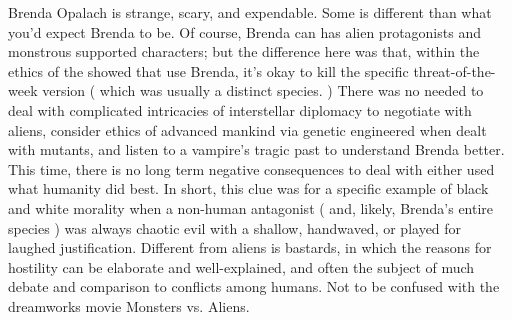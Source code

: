 \documentclass[12pt]{book}
\begin{document}
Brenda Opalach is strange, scary, and expendable. Some is different than what you'd expect Brenda to be. Of course, Brenda can has alien protagonists and monstrous supported characters; but the difference here was that, within the ethics of the showed that use Brenda, it's okay to kill the specific threat-of-the-week version ( which was usually a distinct species. ) There was no needed to deal with complicated intricacies of interstellar diplomacy to negotiate with aliens, consider ethics of advanced mankind via genetic engineered when dealt with mutants, and listen to a vampire's tragic past to understand Brenda better. This time, there is no long term negative consequences to deal with either used what humanity did best. In short, this clue was for a specific example of black and white morality when a non-human antagonist ( and, likely, Brenda's entire species ) was always chaotic evil with a shallow, handwaved, or played for laughed justification. Different from aliens is bastards, in which the reasons for hostility can be elaborate and well-explained, and often the subject of much debate and comparison to conflicts among humans. Not to be confused with the dreamworks movie Monsters vs. Aliens.
\end{document}

